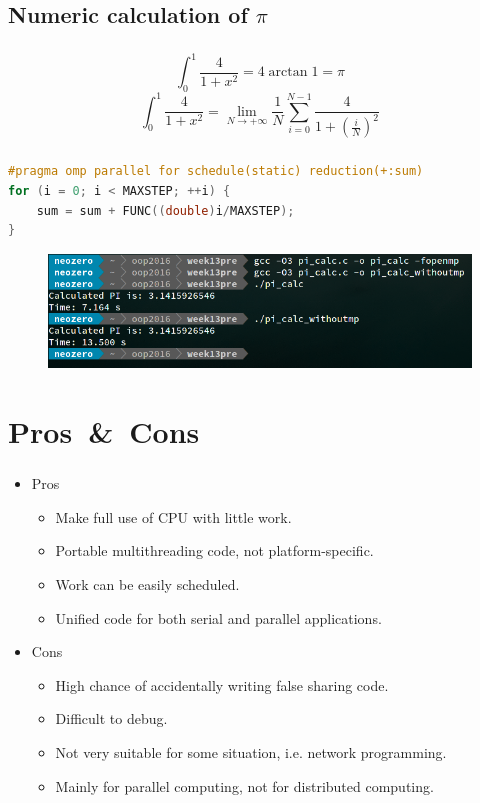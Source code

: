 \documentclass{beamer}
\begin{document}
	\subsection{Numeric calculation of $\pi$}
	\begin{frame}
		\frametitle{\insertsubsection}
		\begin{equation}
			\int_{0}^1\dfrac{4}{1+x^2}=4\arctan1=\pi
		\end{equation}
		\begin{equation}
			\int_{0}^1\dfrac{4}{1+x^2}=\lim_{N\rightarrow +\infty}\dfrac{1}{N}\sum_{i=0}^{N-1}\dfrac{4}{1+\left(\frac{i}{N}\right)^2}
		\end{equation}
	\end{frame}
	\begin{frame}[fragile]
		\frametitle{\insertsubsection}
		\begin{lstlisting}[language=C++,numbers=none]
#pragma omp parallel for schedule(static) reduction(+:sum)
for (i = 0; i < MAXSTEP; ++i) {
    sum = sum + FUNC((double)i/MAXSTEP);
}\end{lstlisting}
\begin{figure}[H]
	\centering
	\includegraphics[width=\linewidth]{pi.png}
\end{figure}
\end{frame}

	\section{Pros\ \&\ Cons}
	\begin{frame}
		\frametitle{\insertsection}
		\begin{itemize}
			\item Pros \begin{itemize}
				\item Make full use of CPU with little work.
				\item Portable multithreading code, not platform-specific.
				\item Work can be easily scheduled.
				\item Unified code for both serial and parallel applications.
			\end{itemize}
			\item Cons \begin{itemize}
				\item High chance of accidentally writing false sharing code.
				\item Difficult to debug.
				\item Not very suitable for some situation, i.e. network programming.
				\item Mainly for parallel computing, not for distributed computing.
			\end{itemize}
		\end{itemize}
	\end{frame}
\end{document}
